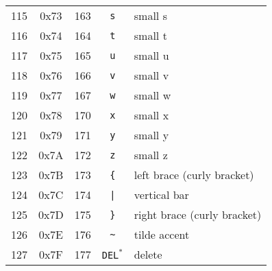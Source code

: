 \begin{supertabular}{r|c|c|c|p{.3\linewidth}}
115 & 0x73 & 163 & \verb|s| &small s  \\
116 & 0x74 & 164 & \verb|t| &small t  \\
117 & 0x75 & 165 & \verb|u| &small u  \\
118 & 0x76 & 166 & \verb|v| &small v  \\
119 & 0x77 & 167 & \verb|w| &small w  \\
120 & 0x78 & 170 & \verb|x| &small x  \\
121 & 0x79 & 171 & \verb|y| &small y  \\
122 & 0x7A & 172 & \verb|z| &small z  \\
123 & 0x7B & 173 & \verb|{| & left brace (curly bracket)\\
124 & 0x7C & 174 & \verb/|/ & vertical bar\\
125 & 0x7D & 175 & \verb|}| & right brace (curly bracket)\\
126 & 0x7E & 176 & \verb|~| & tilde accent\\
127 & 0x7F & 177 & \texttt{DEL}$^*$ & delete\\
\end{supertabular}
